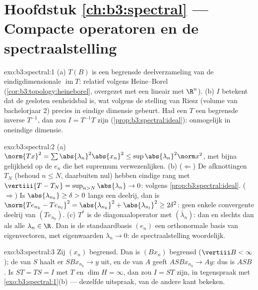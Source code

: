 \section*{Hoofdstuk \ref{ch:b3:spectral} --- Compacte operatoren
en de spectraalstelling}

\begin{solution}{exo:b3:spectral:1}
(a) $T(B)$ is een begrensde deelverzameling van de
eindigdimensionale $\operatorname{im}T$: relatief  volgens
Heine--Borel (\cref{cor:b3:topology:heineborel}, overgezet met
een lineair  met $\R^n$).
(b) $I$  betekent dat de gesloten eenheidsbal  is,
wat volgens de stelling van Riesz (volume van bachelorjaar 2)
precies in eindige dimensie gebeurt. Had een  $T$ een
begrensde inverse $T^{-1}$, dan zou $I = T^{-1}T$  zijn
(\cref{prop:b3:spectral:ideal}): onmogelijk in oneindige
dimensie.
\end{solution}

\begin{solution}{exo:b3:spectral:2}
(a) $\norm{Tx}^2 = \sum\abs{\lambda_n}^2\abs{x_n}^2 \leq
\sup\abs{\lambda_n}^2\norm x^2$, met bijna gelijkheid op de $e_n$
die het supremum verwezenlijken.
(b) ($\Leftarrow$) De afknottingen $T_N$ (behoud $n \leq N$,
daarbuiten nul) hebben eindige rang met $\vertiii{T - T_N} =
\sup_{n>N}\abs{\lambda_n} \to 0$:  volgens
\cref{prop:b3:spectral:ideal}. ($\Rightarrow$) Is
$\abs{\lambda_{n_k}} \geq \delta > 0$ langs een deelrij, dan is
$\norm{Te_{n_k} - Te_{n_l}}^2 = \abs{\lambda_{n_k}}^2 +
\abs{\lambda_{n_l}}^2 \geq 2\delta^2$: geen enkele convergente
deelrij van $(Te_{n_k})$.
(c) $T^*$ is de diagonaaloperator met $(\bar\lambda_n)$:
 dan en slechts dan als alle $\lambda_n \in \R$.
Dan is de standaardbasis $(e_n)$ een orthonormale basis van
eigenvectoren, met eigenwaarden $\lambda_n \to 0$: de
spectraalstelling woordelijk.
\end{solution}

\begin{solution}{exo:b3:spectral:3}
Zij $(x_n)$ begrensd. Dan is $(Bx_n)$ begrensd ($\vertiii B <
\infty$); de  van $S$ haalt er $SBx_{n_k} \to y$ uit,
en de  van $A$ geeft $ASBx_{n_k} \to Ay$: dus is
$ASB$ . Is $ST = TS = I$ met $T$  en $\dim H =
\infty$, dan zou $I = ST$  zijn, in tegenspraak met
\cref{exo:b3:spectral:1}(b) --- dezelfde uitspraak, van de andere
kant bekeken.
\end{solution}

